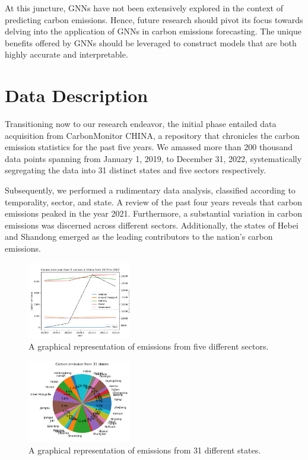 \documentclass[sigconf, authordraft]{acmart}
\begin{document}
At this juncture, GNNs have not been extensively explored in the context of
predicting carbon emissions. Hence, future research should pivot its focus
towards delving into the application of GNNs in carbon emissions forecasting. The
unique benefits offered by GNNs should be leveraged to construct models that are
both highly accurate and interpretable.

\section{Data Description}
Transitioning now to our research endeavor, the initial phase entailed data
acquisition from CarbonMonitor CHINA, a repository that chronicles the carbon emission
statistics for the past five years. We amassed more than 200 thousand data
points spanning from January 1, 2019, to December 31, 2022, systematically
segregating the data into 31 distinct states and five sectors respectively.

Subsequently, we performed a rudimentary data analysis, classified according
to temporality, sector, and state. A review of the past four years reveals that
carbon emissions peaked in the year 2021. Furthermore, a substantial variation
in carbon emissions was discerned across different sectors. Additionally, the
states of Hebei and Shandong emerged as the leading contributors to the nation's
carbon emissions.

\begin{figure}[ht]
	\centering
	\includegraphics[width=0.4\textwidth]{figures/emissions_from_5_sectors.png}
	\caption{A graphical representation of emissions from five different sectors.}
	\label{fig:emissions_from_5_sectors}
\end{figure}

\begin{figure}[ht]
	\centering
	\includegraphics[width=0.4\textwidth]{figures/emissions_from_31_states.png}
	\caption{A graphical representation of emissions from 31 different states.}
	\label{fig:emissions_from_31_states}
\end{figure}
\end{document}
